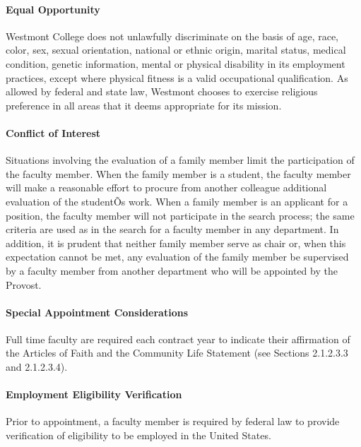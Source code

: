 \documentclass[letterpaper, 11pt]{article}
\begin{document}
			\paragraph{Equal Opportunity}
				Westmont College does not unlawfully discriminate on the basis of age, race, color, sex, sexual orientation, national or ethnic origin, marital status, medical condition, genetic information, mental or physical disability in its employment practices, except where physical fitness is a valid occupational qualification. As allowed by federal and state law, Westmont chooses to exercise religious preference in all areas that it deems appropriate for its mission.
			\paragraph{Conflict of Interest}
				Situations involving the evaluation of a family member limit the participation of the faculty member.  When the family member is a student, the faculty member will make a reasonable effort to procure from another colleague additional evaluation of the studentÕs work.  When a family member is an applicant for a position, the faculty member will not participate in the search process; the same criteria are used as in the search for a faculty member in any department.  In addition, it is prudent that neither family member serve as chair or, when this expectation cannot be met, any evaluation of the family member be supervised by a faculty member from another department who will be appointed by the Provost.
			\paragraph{Special Appointment Considerations}
				Full time faculty are required each contract year to indicate their affirmation of the Articles of Faith and the Community Life Statement (see Sections 2.1.2.3.3 and 2.1.2.3.4).
			\paragraph{Employment Eligibility Verification}
				Prior to appointment, a faculty member is required by federal law to provide verification of eligibility to be employed in the United States.
\end{document}

